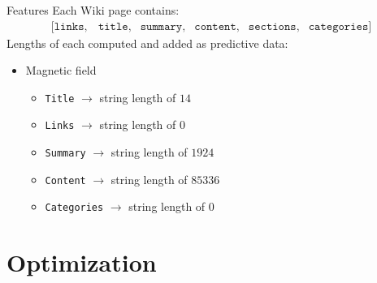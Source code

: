 \documentclass{beamer}
\begin{document}

\begin{frame}{Features}
    Each Wiki page contains:
        \[
            \begin{array}{llllll}
                [ \texttt{links}, & \texttt{title}, & \texttt{summary}, & \texttt{content}, & \texttt{sections}, & \texttt{categories}]
            \end{array}\]
     Lengths of each computed and added as predictive data: \\

        \begin{itemize}
            \item {\color{blue}Magnetic field}
	\begin{itemize}
		\item \texttt{Title} $\longrightarrow$ string length of {\color{red}$14$}
		\item \texttt{Links} $\longrightarrow$ string length of {\color{red}$0$}
		\item \texttt{Summary} $\longrightarrow$ string length of {\color{red}$1924$}
		\item \texttt{Content} $\longrightarrow$ string length of {\color{red}$85336$}
		\item \texttt{Categories} $\longrightarrow$ string length of {\color{red}$0$}
	\end{itemize}
        \end{itemize}
\end{frame}


\section{Optimization}
\end{document}
